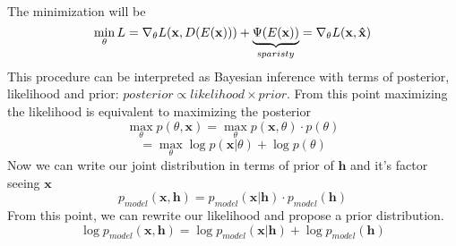 \documentclass[11pt,twocolumn]{article}
\begin{document}
\\
The minimization will be
\begin{equation}
\min\limits_{\theta} L = \nabla_\theta L(\mathbf{x}, D(E(\mathbf{x}))) + \underbrace{\Psi(E(\mathbf{x}))}_{\text sparisty} =\nabla_\theta L(\mathbf{x}, \mathbf{\hat{x}}) 
\end{equation}
This procedure can be interpreted as Bayesian inference with terms of posterior, likelihood and prior: $posterior \propto likelihood \times prior$. From this point maximizing the likelihood is equivalent to maximizing the posterior
\begin{equation}
\max\limits_{\theta} p(\theta,\mathbf{x})=\max\limits_{\theta} p(\mathbf{x},\theta) \cdot p(\theta)
\end{equation}
\begin{equation}
=\max\limits_{\theta}\log p(\mathbf{x} | \theta) + \log p(\theta)
\end{equation}
Now we can write our joint distribution in terms of prior of $\mathbf{h}$ and it's factor seeing  $\mathbf{x}$ 
\begin{equation}
p_{model}(\mathbf{x},\mathbf{h}) = p_{model}(\mathbf{x}|\mathbf{h}) \cdot p_{model}(\mathbf{h})
\end{equation}
From this point, we can rewrite our likelihood and propose a prior distribution.
\begin{equation} 
\log p_{model}(\mathbf{x},\mathbf{h}) = \log p_{model}(\mathbf{x}|\mathbf{h}) + \log p_{model}(\mathbf{h})
\end{equation}
\end{document}
